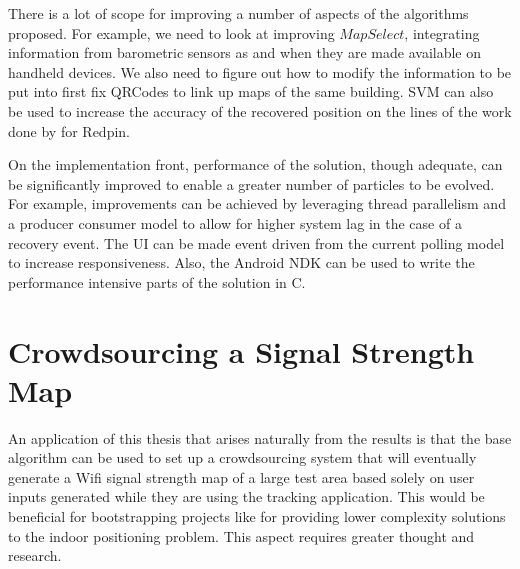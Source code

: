 There is a lot of scope for improving a number of aspects of the 
algorithms proposed. For example, we need to look at improving $MapSelect$,
integrating information from barometric sensors as and when they are made
available on handheld devices. We also need to figure out how to modify
the information to be put into first fix QRCodes to link up maps of 
the same building. SVM can also be used to increase the accuracy of the 
recovered position on the lines of the work done by \cite{ETHLuba} for 
Redpin\cite{Redpin}.

On the implementation front, performance of the solution, though 
adequate, can be significantly improved to enable a greater number of particles
to be evolved. For example, 
improvements can be achieved by leveraging thread parallelism and a 
producer consumer model to allow for higher system lag in the case of 
a recovery event. The UI can be made event driven from the current 
polling model to increase responsiveness. Also, the Android NDK can be used 
to write the performance intensive parts of the solution in C.


\section{Crowdsourcing a Signal Strength Map}

An application of this thesis that arises naturally from the results is that
the base algorithm can be used to set up a crowdsourcing system that will 
eventually generate a Wifi signal strength map of a large test area based 
solely on user inputs generated while they are using the tracking application. 
This would be beneficial for bootstrapping projects like \cite{Redpin} for 
providing lower complexity solutions to the indoor positioning problem. 
This aspect requires greater thought and research.




